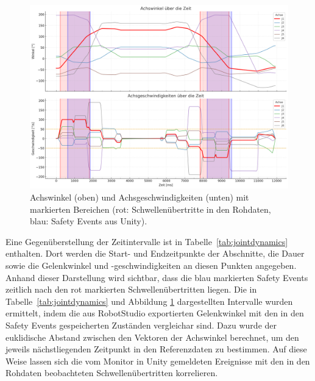 \begin{figure}[H]
  \centering
  \includegraphics[width=\textwidth]{Figures/achsgeschwindigkeitPlot.png}
  \caption{Achswinkel (oben) und Achsgeschwindigkeiten (unten) mit markierten
    Bereichen (rot: Schwellenübertritte in den Rohdaten, blau: Safety
  Events aus Unity).}
  \label{fig:jointdynamics}
\end{figure}

Eine Gegenüberstellung der Zeitintervalle ist in
Tabelle~\ref{tab:jointdynamics} enthalten.
Dort werden die Start- und Endzeitpunkte der Abschnitte, die Dauer
sowie die Gelenkwinkel
und -geschwindigkeiten an diesen Punkten angegeben. Anhand dieser
Darstellung wird sichtbar,
dass die blau markierten Safety Events zeitlich nach den rot
markierten Schwellenübertritten
liegen. Die in Tabelle~\ref{tab:jointdynamics} und Abbildung
\ref{fig:jointdynamics} dargestellten Intervalle wurden ermittelt,
indem die aus RobotStudio exportierten Gelenkwinkel mit den in den Safety Events
gespeicherten Zuständen vergleichar sind. Dazu wurde der euklidische
Abstand zwischen
den Vektoren der Achswinkel berechnet, um den jeweils nächstliegenden
Zeitpunkt in
den Referenzdaten zu bestimmen. Auf diese Weise lassen sich die vom
Monitor in Unity
gemeldeten Ereignisse mit den in den Rohdaten beobachteten Schwellenübertritten
korrelieren.

